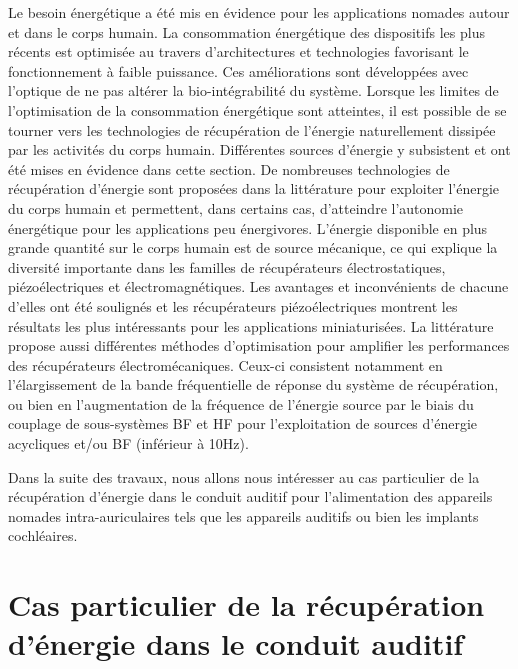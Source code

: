 Le besoin énergétique a été mis en évidence pour les applications nomades autour et dans le corps humain. La consommation énergétique des dispositifs les plus récents est optimisée au travers d'architectures et technologies favorisant le fonctionnement à faible puissance. Ces améliorations sont développées avec l'optique de ne pas altérer la bio-intégrabilité du système. Lorsque les limites de l'optimisation de la consommation énergétique sont atteintes, il est possible de se tourner vers les technologies de récupération de l'énergie naturellement dissipée par les activités du corps humain. Différentes sources d'énergie y subsistent et ont été mises en évidence dans cette section. De nombreuses technologies de récupération d'énergie sont proposées dans la littérature pour exploiter l'énergie du corps humain et permettent, dans certains cas, d'atteindre l'autonomie énergétique pour les applications peu énergivores. L'énergie disponible en plus grande quantité sur le corps humain est de source mécanique, ce qui explique la diversité importante dans les familles de récupérateurs électrostatiques, piézoélectriques et électromagnétiques. Les avantages et inconvénients de chacune d'elles ont été soulignés et les récupérateurs piézoélectriques montrent les résultats les plus intéressants pour les applications miniaturisées. La littérature propose aussi différentes méthodes d'optimisation pour amplifier les performances des récupérateurs électromécaniques. Ceux-ci consistent notamment en l'élargissement de la bande fréquentielle de réponse du système de récupération, ou bien en l'augmentation de la fréquence de l'énergie source par le biais du couplage de sous-systèmes BF et HF pour l'exploitation de sources d'énergie acycliques et/ou BF (inférieur à 10Hz).

Dans la suite des travaux, nous allons nous intéresser au cas particulier de la récupération d'énergie dans le conduit auditif pour l'alimentation des appareils nomades intra-auriculaires tels que les appareils auditifs ou bien les implants cochléaires.
\section{Cas particulier de la récupération d’énergie dans le conduit \mbox{auditif}}
\label{sec:1.4_Cas particulier de la recuperation d energie dans le conduit auditif}
